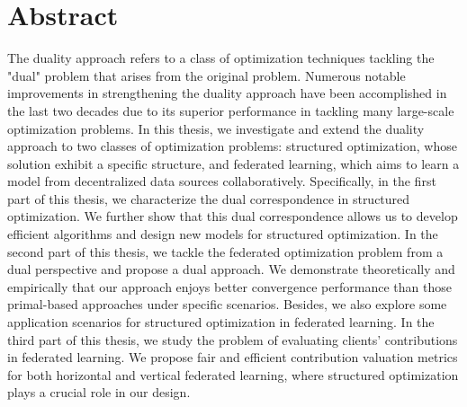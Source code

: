 
\chapter{Abstract}

The duality approach refers to a class of optimization techniques tackling the "dual" problem that arises from the original problem. Numerous notable improvements in strengthening the duality approach have been accomplished in the last two decades due to its superior performance in tackling many large-scale optimization problems. In this thesis, we investigate and extend the duality approach to two classes of optimization problems: structured optimization, whose solution exhibit a specific structure, and federated learning, which aims to learn a model from decentralized data sources collaboratively. Specifically, in the first part of this thesis, we characterize the dual correspondence in structured optimization. We further show that this dual correspondence allows us to develop efficient algorithms and design new models for structured optimization. In the second part of this thesis, we tackle the federated optimization problem from a dual perspective and propose a dual approach. We demonstrate theoretically and empirically that our approach enjoys better convergence performance than those primal-based approaches under specific scenarios. Besides, we also explore some application scenarios for structured optimization in federated learning. In the third part of this thesis, we study the problem of evaluating clients' contributions in federated learning. We propose fair and efficient contribution valuation metrics for both horizontal and vertical federated learning, where structured optimization plays a crucial role in our design. 








